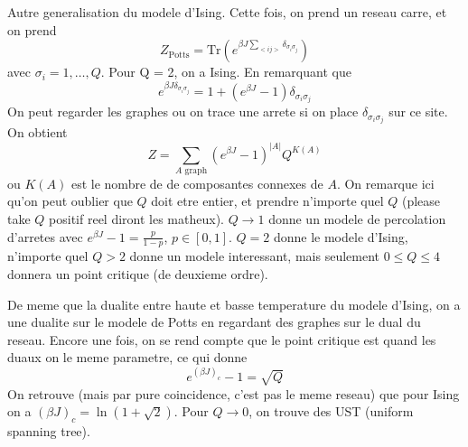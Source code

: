 \documentclass[a4paper]{book}
\theoremstyle{definition}
\theoremstyle{remark}
\begin{document}
Autre generalisation du modele d'Ising. \newline 
Cette fois, on prend un reseau carre, et on prend 
\begin{equation}
    Z_{\text{Potts}} = \text{Tr}(e^{\beta J \sum_{<ij>}\delta_{\sigma_i \sigma_j}})
\end{equation}
avec $\sigma_i = 1,\dots , Q$. Pour Q = 2, on a Ising. En remarquant que 
\begin{equation}
    e^{\beta J \delta _{\sigma_i \sigma_j}} = 1 + (e^{\beta J} - 1)\delta _{\sigma_i \sigma_j}
\end{equation}
On peut regarder les graphes ou on trace une arrete si on place $\delta _{\sigma_i \sigma_j}$ sur ce site. On obtient 
\begin{equation}
    Z = \sum_{A \text{ graph}} (e^{\beta J} - 1)^{|A|} Q^{K(A)}
\end{equation}
ou $K(A)$ est le nombre de de composantes connexes de $A$. 
On remarque ici qu'on peut oublier que $Q$ doit etre entier, et prendre n'importe quel $Q$ (please take $Q$ positif reel diront les matheux). $Q \rightarrow 1$ donne un modele de percolation d'arretes avec $e^{\beta J} - 1 = \frac{p}{1-p}$, $p\in [0,1]$. $Q = 2$ donne le modele d'Ising, n'importe quel $Q > 2$ donne un modele interessant, mais seulement $0\leq Q \leq 4$ donnera un point critique (de deuxieme ordre).\par \medskip
De meme que la dualite entre haute et basse temperature du modele d'Ising, on a une dualite sur le modele de Potts en regardant des graphes sur le dual du reseau. Encore une fois, on se rend compte que le point critique est quand les duaux on le meme parametre, ce qui donne 
\begin{equation}
    e^{(\beta J)_c} - 1 = \sqrt{Q}
\end{equation}
On retrouve (mais par pure coincidence, c'est pas le meme reseau) que pour Ising on a $(\beta J)_c = \ln (1 + \sqrt{2})$. Pour $Q \rightarrow 0$, on trouve des UST (uniform spanning tree). 
\end{document}
